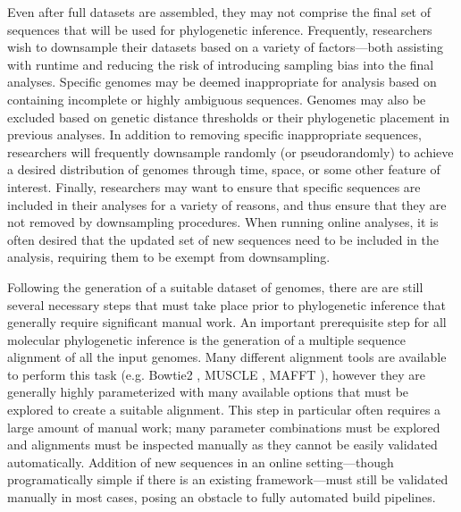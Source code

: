 Even after full datasets are assembled, they may not comprise the final set of sequences that will be used for phylogenetic inference.
Frequently, researchers wish to downsample their datasets based on a variety of factors---both assisting with runtime and reducing the risk of introducing sampling bias into the final analyses.
Specific genomes may be deemed inappropriate for analysis based on containing incomplete or highly ambiguous sequences.
Genomes may also be excluded based on genetic distance thresholds or their phylogenetic placement in previous analyses.
In addition to removing specific inappropriate sequences, researchers will frequently downsample randomly (or pseudorandomly) to achieve a desired distribution of genomes through time, space, or some other feature of interest.
Finally, researchers may want to ensure that specific sequences are included in their analyses for a variety of reasons, and thus ensure that they are not removed by downsampling procedures.
When running online analyses, it is often desired that the updated set of new sequences need to be included in the analysis, requiring them to be exempt from downsampling.

Following the generation of a suitable dataset of genomes, there are are still several necessary steps that must take place prior to phylogenetic inference that generally require significant manual work.
An important prerequisite step for all molecular phylogenetic inference is the generation of a multiple sequence alignment of all the input genomes.
Many different alignment tools are available to perform this task (e.g. Bowtie2 \cite{langmead2012fast}, MUSCLE \cite{edgar2004muscle}, MAFFT \cite{katoh2013mafft}), however they are generally highly parameterized with many available options that must be explored to create a suitable alignment.
This step in particular often requires a large amount of manual work; many parameter combinations must be explored and alignments must be inspected manually as they cannot be easily validated automatically.
Addition of new sequences in an online setting---though programatically simple if there is an existing framework---must still be validated manually in most cases, posing an obstacle to fully automated build pipelines.

